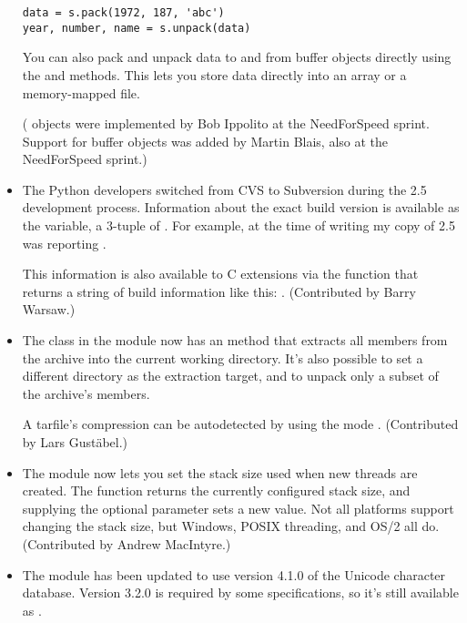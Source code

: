 \documentclass{howto}
\begin{document}
\begin{itemize}
\begin{verbatim}
data = s.pack(1972, 187, 'abc')
year, number, name = s.unpack(data)
\end{verbatim}

You can also pack and unpack data to and from buffer objects directly
using the  and 
methods.  This lets you store data directly into an array or a
memory-mapped file.

( objects were implemented by Bob Ippolito at the
NeedForSpeed sprint.  Support for buffer objects was added by Martin
Blais, also at the NeedForSpeed sprint.)

\item The Python developers switched from CVS to Subversion during the 2.5
development process.  Information about the exact build version is
available as the  variable, a 3-tuple of
.  For example, at the time of writing my copy
of 2.5 was reporting .

This information is also available to C extensions via the 
 function that returns a 
string of build information like this:
.  
(Contributed by Barry Warsaw.)

\item The  class in the  module now has
an  method that extracts all members from the
archive into the current working directory.  It's also possible to set
a different directory as the extraction target, and to unpack only a
subset of the archive's members.  

A tarfile's compression can be autodetected by 
using the mode .
(Contributed by Lars Gust\"abel.)

\item The  module now lets you set the stack size
used when new threads are created. The
 function returns the
currently configured stack size, and supplying the optional 
parameter sets a new value.  Not all platforms support changing the
stack size, but Windows, POSIX threading, and OS/2 all do.
(Contributed by Andrew MacIntyre.)

\item The  module has been updated to use version 4.1.0
of the Unicode character database.  Version 3.2.0 is required 
by some specifications, so it's still available as 
.


\end{itemize}
\end{document}
